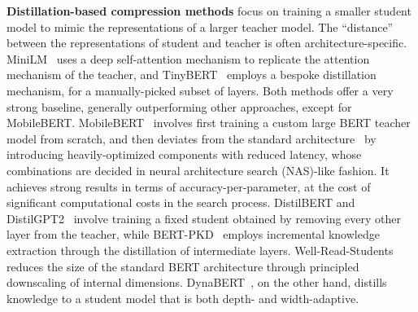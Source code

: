 \documentclass{article}
\theoremstyle{plain}
\theoremstyle{definition}
\theoremstyle{remark}
\renewcommand{\paragraph}[1]{ \noindent \textbf{#1}}
\begin{document}
\paragraph{Distillation-based compression methods} focus on training a smaller student model to mimic the representations of a larger teacher model. 
The ``distance'' between the representations of student and teacher is often architecture-specific. 
MiniLM~\citep{Wang2020MiniLMDS} uses a deep self-attention mechanism to replicate the attention mechanism of the teacher, and TinyBERT~\citep{Jiao2020TinyBERTDB} employs a bespoke distillation mechanism, for a manually-picked subset of layers. Both methods offer a very strong baseline, generally outperforming other approaches, except for MobileBERT. MobileBERT~\citep{sun2020mobilebert} involves first training a custom large BERT teacher model from scratch, and then deviates from the standard architecture~\citep{Devlin2019BERTPO} by introducing heavily-optimized components with reduced latency, whose combinations are decided in neural architecture search (NAS)-like fashion. It achieves strong results in terms of accuracy-per-parameter, at the cost of significant computational costs in the search process.
DistilBERT and DistilGPT2~\citep{Sanh2019DistilBERTAD} involve training a fixed student obtained by removing every other layer from the teacher, 
while BERT-PKD~\citep{sun2019patient} employs incremental knowledge extraction through the distillation of intermediate layers. 
Well-Read-Students~\citep{Turc2019WellReadSL} reduces the size of the standard BERT architecture through principled downscaling of internal dimensions. DynaBERT~\citep{hou2020dynabert}, on the other hand, distills knowledge to a student model that is both depth- and width-adaptive.
\end{document}
